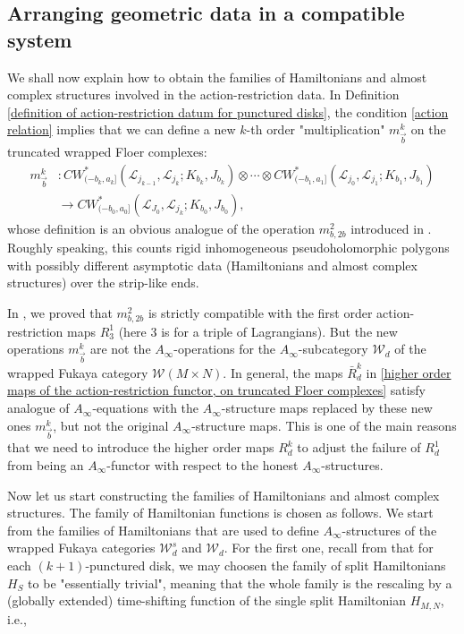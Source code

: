 \documentclass{amsart}
\numberwithin{equation}{section}
\numberwithin{figure}{section}
\begin{document}
\subsection{Arranging geometric data in a compatible system}
	We shall now explain how to obtain the families of Hamiltonians and almost complex structures involved in the action-restriction data. In Definition \eqref{definition of action-restriction datum for punctured disks}, the condition \eqref{action relation} implies that we can define a new $k$-th order "multiplication" $m^{k}_{\vec{b}}$ on the truncated wrapped Floer complexes:
\begin{equation}
\begin{split}
m^{k}_{\vec{b}}&: CW^{*}_{(-b_{k}, a_{k}]}(\mathcal{L}_{j_{k-1}}, \mathcal{L}_{j_{k}}; K_{b_{k}}, J_{b_{k}}) \otimes \cdots \otimes CW^{*}_{(-b_{1}, a_{1}]}(\mathcal{L}_{j_{0}}, \mathcal{L}_{j_{1}}; K_{b_{1}}, J_{b_{1}})\\
& \to CW^{*}_{(-b_{0}, a_{0}]}(\mathcal{L}_{J_{0}}, \mathcal{L}_{j_{k}}; K_{b_{0}}, J_{b_{0}}),
\end{split}
\end{equation}
whose definition is an obvious analogue of the operation $m^{2}_{b, 2b}$ introduced in \cite{Gao1}. Roughly speaking, this counts rigid inhomogeneous pseudoholomorphic polygons with possibly different asymptotic data (Hamiltonians and almost complex structures) over the strip-like ends. \par
	In \cite{Gao1}, we proved that $m^{2}_{b, 2b}$ is strictly compatible with the first order action-restriction maps $R_{3}^{1}$ (here $3$ is for a triple of Lagrangians). But the new operations $m^{k}_{\vec{b}}$ are not the $A_{\infty}$-operations for the $A_{\infty}$-subcategory $\mathcal{W}_{d}$ of the wrapped Fukaya category $\mathcal{W}(M \times N)$. In general, the maps $\bar{R}_{d}^{k}$ in \eqref{higher order maps of the action-restriction functor, on truncated Floer complexes} satisfy analogue of $A_{\infty}$-equations with the $A_{\infty}$-structure maps replaced by these new ones $m^{k}_{\vec{b}}$, but not the original $A_{\infty}$-structure maps. This is one of the main reasons that we need to introduce the higher order maps $R_{d}^{k}$ to adjust the failure of $R_{d}^{1}$ from being an $A_{\infty}$-functor with respect to the honest $A_{\infty}$-structures. \par
	Now let us start constructing the families of Hamiltonians and almost complex structures. The family of Hamiltonian functions is chosen as follows. We start from the families of Hamiltonians that are used to define $A_{\infty}$-structures of the wrapped Fukaya categories $\mathcal{W}^{s}_{d}$ and $\mathcal{W}_{d}$. For the first one, recall from \cite{Gao1} that for each $(k+1)$-punctured disk, we may choosen the family of split Hamiltonians $H_{S}$ to be "essentially trivial", meaning that the whole family is the rescaling by a (globally extended) time-shifting function of the single split Hamiltonian $H_{M, N}$, i.e.,
\end{document}
